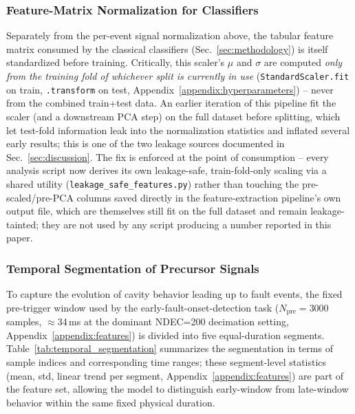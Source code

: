 \subsubsection{Feature-Matrix Normalization for Classifiers}

Separately from the per-event signal normalization above, the tabular feature matrix consumed by the classical classifiers (Sec.~\ref{sec:methodology}) is itself standardized before training. Critically, this scaler's $\mu$ and $\sigma$ are computed \emph{only from the training fold of whichever split is currently in use} (\texttt{StandardScaler.fit} on train, \texttt{.transform} on test, Appendix~\ref{appendix:hyperparameters}) -- never from the combined train+test data. An earlier iteration of this pipeline fit the scaler (and a downstream PCA step) on the full dataset before splitting, which let test-fold information leak into the normalization statistics and inflated several early results; this is one of the two leakage sources documented in Sec.~\ref{sec:discussion}. The fix is enforced at the point of consumption -- every analysis script now derives its own leakage-safe, train-fold-only scaling via a shared utility (\texttt{leakage\_safe\_features.py}) rather than touching the pre-scaled/pre-PCA columns saved directly in the feature-extraction pipeline's own output file, which are themselves still fit on the full dataset and remain leakage-tainted; they are not used by any script producing a number reported in this paper. %

\subsubsection{Temporal Segmentation of Precursor Signals}

To capture the evolution of cavity behavior leading up to fault events, the fixed pre-trigger window used by the early-fault-onset-detection task ($N_{\mathrm{pre}} = 3000$ samples, $\approx$34\,ms at the dominant NDEC=200 decimation setting, Appendix~\ref{appendix:features}) %
is divided into five equal-duration segments. Table~\ref{tab:temporal_segmentation} summarizes the segmentation in terms of sample indices and corresponding time ranges; these segment-level statistics (mean, std, linear trend per segment, Appendix~\ref{appendix:features}) are part of the feature set, allowing the model to distinguish early-window from late-window behavior within the same fixed physical duration.

